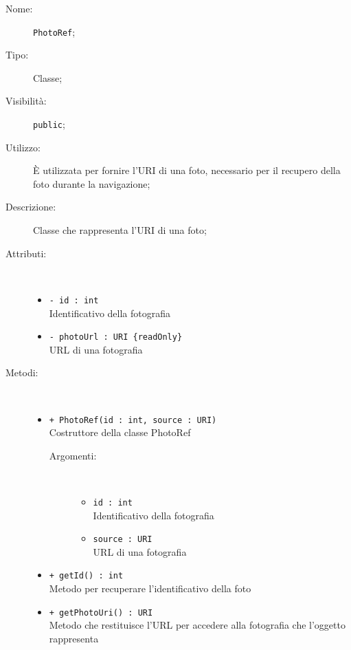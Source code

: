 \documentclass[../DefinizioneDiProdotto.tex]{subfiles}
\begin{document}
\begin{description}
	\item[Nome:] \texttt{PhotoRef};
	\item[Tipo:] Classe;
	\item[Visibilità:] \texttt{public};
	\item[Utilizzo:] È utilizzata per fornire l'URI di una foto, necessario per il recupero della foto durante la navigazione;
	\item[Descrizione:] Classe che rappresenta l'URI di una foto;
	\item[Attributi:] \
	\begin{itemize}
		\item \texttt{- id : int}\\
		Identificativo della fotografia
		
		\item \texttt{- photoUrl : URI \{readOnly\}}\\
		URL di una fotografia
		
	\end{itemize}
	\item[Metodi:] \
	\begin{itemize}
		\item \texttt{+ PhotoRef(id : int, source : URI)}\\
		Costruttore della classe PhotoRef
		\begin{description}
			\item[Argomenti:] \
			\begin{itemize}
				\item \texttt{id : int}\\
				Identificativo della fotografia\item \texttt{source : URI}\\
				URL di una fotografia\end{itemize}
		\end{description}
		\item \texttt{+ getId() : int}\\
		Metodo per recuperare l'identificativo della foto
		\item \texttt{+ getPhotoUri() : URI}\\
		Metodo che restituisce l'URL per accedere alla fotografia che l'oggetto rappresenta
	\end{itemize}
\end{description}
\end{document}
